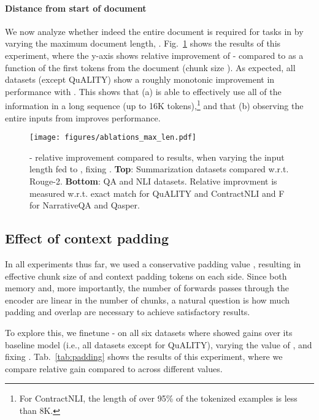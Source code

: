 \paragraph{Distance from start of document}
We now analyze whether indeed the entire document is required for tasks in \SCROLLS{} by varying the maximum document length, .
Fig.~\ref{fig:ab-length} shows the results of this experiment, where the y-axis shows relative improvement of \bartbase{}-\sled{} compared to \bartbase{} as a function of the first  tokens from the document (chunk size ). As expected, all datasets (except QuALITY) show a roughly monotonic improvement in performance with . 
This shows that
(a) \sled{} is able to effectively use all of the information in a long sequence (up to 16K tokens),\footnote{For ContractNLI, the length of over 95\% of the tokenized examples is less than 8K.} and that (b) observing the entire inputs from \SCROLLS{} improves performance.
\begin{figure}[t]
\begin{center}


\centerline{
\texttt{[image: figures/ablations\_max\_len.pdf]}
}
\setlength{\belowcaptionskip}{-20pt}
\caption{\bartbase{}-\sled{} relative improvement compared to \bartbase{} results, when varying the input length fed to \sled{}, fixing . \textbf{Top}: Summarization datasets compared w.r.t. Rouge-2. \textbf{Bottom}: QA and NLI datasets. Relative improvment is measured w.r.t. exact match for QuALITY and ContractNLI and F for NarrativeQA and Qasper.}
 

\label{fig:ab-length}
\end{center}
\end{figure} 
\subsection{Effect of context padding}
In all experiments thus far, we used a conservative padding value , resulting in effective chunk size of  and  context padding tokens on each side.
Since both memory and, more importantly, the number of forwards passes through the encoder are linear in the number of chunks, a natural question is how much padding and overlap are necessary to achieve satisfactory results. 

To explore this, we finetune \bartbase{}-\sled{} on all six datasets  where \sled{} showed gains over its baseline model (i.e., all datasets except for QuALITY), varying the value of , and fixing . Tab.~\ref{tab:padding} shows the results of this experiment, where we compare relative gain compared to \bartbase{} across different  values.

